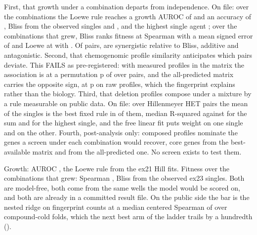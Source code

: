  First, that growth under a
combination departs from independence. On file: over the \hydnCombinations{} combinations
the Loewe rule reaches a growth AUROC of \hydloeweAuroc{} and an accuracy of
\hydloeweAccuracy{}, Bliss from the observed singles \hydblissAuroc{} and
\hydblissAccuracy{}, and the highest single agent \hydhsaAuroc{}; over the
\hydnGrewServed{} combinations that grew, Bliss ranks fitness at Spearman
\hydblissSpearman{} with a mean signed error of \hydblissSignedError{} and Loewe at
\hydloeweSpearman{} with \hydloeweSignedError{}. Of \hydnPairs{} pairs,
\hydnPairsSynergy{} are synergistic relative to Bliss, \hydnPairsAdditive{} additive and
\hydnPairsAntagonism{} antagonistic. Second, that chemogenomic profile similarity
anticipates which pairs deviate. This FAILS as pre-registered: with measured profiles in
the matrix the association is \hydsvdBestSpearman{} at a permutation p of
\hydsvdBestP{} over \hydsvdBestPairs{} pairs, and the all-predicted matrix carries the
opposite sign, \hydsvdPredRawSpearman{} at p \hydsvdPredRawP{} on raw profiles, which the
fingerprint explains rather than the biology. Third, that deletion profiles compose under
a mixture by a rule measurable on public data. On file: over \hydhetPairs{} Hillenmeyer
HET pairs the mean of the singles is the best fixed rule in \hydhetMeanWins{} of them,
median R-squared \hydhetrTwomean{} against \hydhetrTwosum{} for the sum and
\hydhetrTwomax{} for the highest single, and the free linear fit puts weight
\hydhetLinA{} on one single and \hydhetLinB{} on the other. Fourth, post-analysis only:
composed profiles nominate the genes a screen under each combination would recover,
\hydnomCoreBest{} core genes from the best-available matrix and \hydnomCorePredicted{}
from the all-predicted one. No screen exists to test them.

 Growth: AUROC \hydloeweAuroc{}, the Loewe rule
from the ex21 Hill fits. Fitness over the combinations that grew: Spearman
\hydblissSpearman{}, Bliss from the observed ex23 singles. Both are model-free, both come
from the same wells the model would be scored on, and both are already in a committed
result file. On the public side the bar is the nested ridge on fingerprint counts at a
median centered Spearman of \hydladderRidge{} over \hydladderCompounds{} compound-cold
folds, which the next best arm of the ladder trails by a hundredth
(\hydladderSecond{}).

